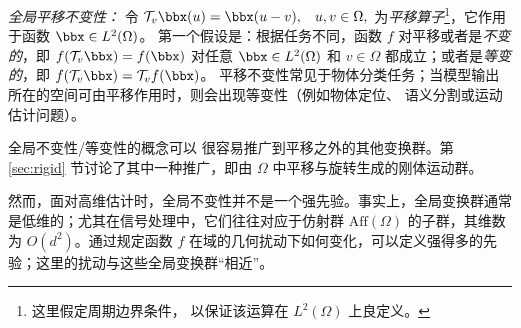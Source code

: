 {{\em 全局平移不变性：}}
令
${\cal T}_v \bbx(u) = \bbx(u - v), \hspace{3mm} u, v \in \Omega,$ 
为\emph{平移算子}\footnote{
这里假定周期边界条件，
以保证该运算在 $L^2(\Omega)$ 上良定义。
}，它作用于函数 $\bbx \in L^2(\Omega)$。%
%
第一个假设是：根据任务不同，函数 $f$ 对平移或者是\emph{不变的}，即 $f({\cal T}_v \bbx) = f(  \bbx) $ 对任意 $\bbx \in L^2(\Omega)$ 和 $v\in \Omega$ 都成立；或者是\emph{等变的}，即 $f({\cal T}_v \bbx) = {\cal T}_v f(\bbx)$。
平移不变性常见于物体分类任务；当模型输出所在的空间可由平移作用时，则会出现等变性（例如物体定位、
语义分割或运动估计问题）。
 
全局不变性/等变性的概念可以
很容易推广到平移之外的其他变换群。第 \ref{sec:rigid} 节讨论了其中一种推广，即由 $\Omega$ 中平移与旋转生成的刚体运动群。
 

然而，面对高维估计时，全局不变性并不是一个强先验。事实上，全局变换群通常是低维的；尤其在信号处理中，它们往往对应于仿射群 $\mathrm{Aff}(\Omega)$ 的子群，其维数为 $O(d^2)$。通过规定函数 $f$ 在域的几何扰动下如何变化，可以定义强得多的先验；这里的扰动与这些全局变换群“相近”。

